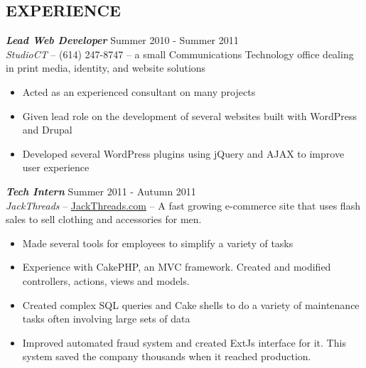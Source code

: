 \documentclass[line,letterpaper]{resume}
\begin{document}
\begin{resume}
    \vspace{-16pt}

    \section{\uppercase{Experience}} {\sl\textbf{Lead Web Developer}} \hfill
    Summer 2010 - Summer 2011\\
    \emph{StudioCT} -- (614) 247-8747 -- a small Communications Technology
    office dealing in print media, identity, and website solutions 
    \begin{itemize}  
        \item Acted as an experienced consultant on many projects
        \item Given lead role on the development of several websites built with
            WordPress and Drupal
        \item Developed several WordPress plugins using jQuery and AJAX to
            improve user experience
    \end{itemize}

    {\sl\textbf{Tech Intern}} \hfill Summer 2011 - Autumn 2011 \\
    \emph{JackThreads} -- \href{http://www.jackthreads.com/}{JackThreads.com}
    -- A fast growing e-commerce site that uses flash sales to sell clothing and
    accessories for men.
    \begin{itemize}  
        \item Made several tools for employees to simplify a variety of tasks
        \item Experience with CakePHP, an MVC framework. Created and modified
            controllers, actions, views and models.
        \item Created complex SQL queries and Cake shells to do a variety of
            maintenance tasks often involving large sets of data
        \item Improved automated fraud system and created ExtJs interface for
            it. This system saved the company thousands when it reached
            production.
    \end{itemize} 


\end{resume}
\end{document}
